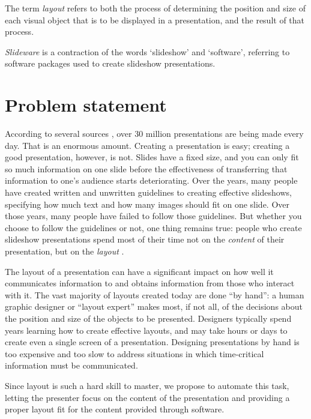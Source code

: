    The term \emph{layout} refers to both the process of determining the
   position and size of each visual object that is to be displayed in a
   presentation, and the result of that process.

   \emph{Slideware} is a contraction of the words `slideshow' and `software',
   referring to software packages used to create slideshow presentations.

  \section{Problem statement}

   According to several sources \citep{parker-1, drucker-1, bajaj-1}, over 30
   million \ppt presentations are being made every day. That is an enormous
   amount. Creating a \ppt presentation is easy; creating a good \ppt
   presentation, however, is not. Slides have a fixed size, and you can only
   fit so much information on one slide before the effectiveness of
   transferring that information to one's audience starts deteriorating. Over
   the years, many people have created written and unwritten guidelines to
   creating effective slideshows, specifying how much text and how many images
   should fit on one slide. Over those years, many people have failed to follow
   those guidelines. But whether you choose to follow the guidelines or
   not, one thing remains true: people who create slideshow presentations spend
   most of their time not on the \emph{content} of their presentation, but on the
   \emph{layout} \citep{lok-1}.

   The layout of a presentation can have a significant impact on how well it
   communicates information to and obtains information from those who interact
   with it. The vast majority of layouts created today are done ``by hand'': a
   human graphic designer or ``layout expert'' makes most, if not all, of the
   decisions about the position and size of the objects to be presented.
   Designers typically spend years learning how to create effective layouts,
   and may take hours or days to create even a single screen of a presentation.
   Designing presentations by hand is too expensive and too slow to address
   situations in which time-critical information must be communicated.

   Since layout is such a hard skill to master, we propose to automate this
   task, letting the presenter focus on the content of the presentation and
   providing a proper layout fit for the content provided through software.

